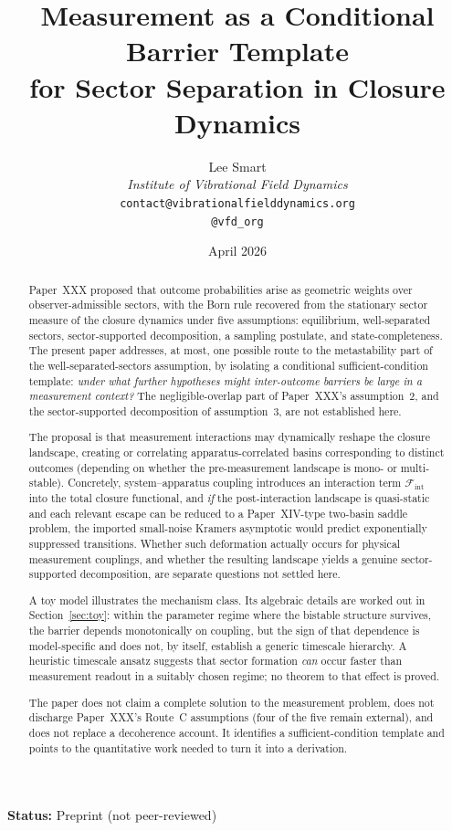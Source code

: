 \documentclass[12pt]{article}
\title{Measurement as a Conditional Barrier Template\\for Sector Separation in Closure Dynamics}
\author{%
  Lee Smart\\[4pt]
  \textit{Institute of Vibrational Field Dynamics}\\[2pt]
  \texttt{contact@vibrationalfielddynamics.org}\\[2pt]
  \texttt{@vfd\_org}%
}
\date{April 2026}
\newcommand{\Fcal}{\mathcal{F}}
\begin{document}
\maketitle

\noindent\textbf{Status:} Preprint (not peer-reviewed)

\begin{abstract}
Paper~XXX proposed that outcome probabilities arise as geometric weights over observer-admissible sectors, with the Born rule recovered from the stationary sector measure of the closure dynamics under five assumptions: equilibrium, well-separated sectors, sector-supported decomposition, a sampling postulate, and state-completeness. The present paper addresses, at most, one possible route to the metastability part of the well-separated-sectors assumption, by isolating a conditional sufficient-condition template: \textit{under what further hypotheses might inter-outcome barriers be large in a measurement context?} The negligible-overlap part of Paper~XXX's assumption~2, and the sector-supported decomposition of assumption~3, are not established here.

The proposal is that measurement interactions may dynamically reshape the closure landscape, creating or correlating apparatus-correlated basins corresponding to distinct outcomes (depending on whether the pre-measurement landscape is mono- or multi-stable). Concretely, system--apparatus coupling introduces an interaction term $\Fcal_{\mathrm{int}}$ into the total closure functional, and \emph{if} the post-interaction landscape is quasi-static and each relevant escape can be reduced to a Paper~XIV-type two-basin saddle problem, the imported small-noise Kramers asymptotic would predict exponentially suppressed transitions. Whether such deformation actually occurs for physical measurement couplings, and whether the resulting landscape yields a genuine sector-supported decomposition, are separate questions not settled here.

A toy model illustrates the mechanism class. Its algebraic details are worked out in Section~\ref{sec:toy}: within the parameter regime where the bistable structure survives, the barrier depends monotonically on coupling, but the sign of that dependence is model-specific and does not, by itself, establish a generic timescale hierarchy. A heuristic timescale ansatz suggests that sector formation \emph{can} occur faster than measurement readout in a suitably chosen regime; no theorem to that effect is proved.

The paper does not claim a complete solution to the measurement problem, does not discharge Paper~XXX's Route~C assumptions (four of the five remain external), and does not replace a decoherence account. It identifies a sufficient-condition template and points to the quantitative work needed to turn it into a derivation.
\end{abstract}
\end{document}
